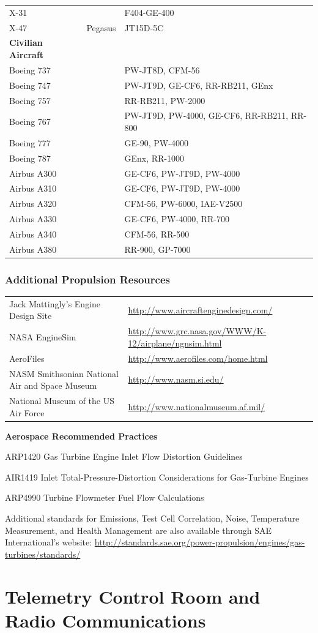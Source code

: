 \documentclass[
]{book}
\begin{document}
\begin{longtable}[]{@{}lll@{}}
X-31 & ~ & F404-GE-400\tabularnewline
X-47 & Pegasus & JT15D-5C\tabularnewline
\textbf{Civilian Aircraft} & &\tabularnewline
Boeing 737 & ~ & PW-JT8D, CFM-56\tabularnewline
Boeing 747 & ~ & PW-JT9D, GE-CF6, RR-RB211, GEnx\tabularnewline
Boeing 757 & ~ & RR-RB211, PW-2000\tabularnewline
Boeing 767 & ~ & PW-JT9D, PW-4000, GE-CF6, RR-RB211, RR-800\tabularnewline
Boeing 777 & ~ & GE-90, PW-4000\tabularnewline
Boeing 787 & ~ & GEnx, RR-1000\tabularnewline
Airbus A300 & ~ & GE-CF6, PW-JT9D, PW-4000\tabularnewline
Airbus A310 & ~ & GE-CF6, PW-JT9D, PW-4000\tabularnewline
Airbus A320 & ~ & CFM-56, PW-6000, IAE-V2500\tabularnewline
Airbus A330 & ~ & GE-CF6, PW-4000, RR-700\tabularnewline
Airbus A340 & ~ & CFM-56, RR-500\tabularnewline
Airbus A380 & ~ & RR-900, GP-7000\tabularnewline
\bottomrule
\end{longtable}

\hypertarget{additional-propulsion-resources}{%
\subsection{Additional Propulsion Resources}\label{additional-propulsion-resources}}

\begin{longtable}[]{@{}ll@{}}
\toprule
\endhead
Jack Mattingly's Engine Design Site & \url{http://www.aircraftenginedesign.com/}\tabularnewline
NASA EngineSim & \url{http://www.grc.nasa.gov/WWW/K-12/airplane/ngnsim.html}\tabularnewline
AeroFiles & \url{http://www.aerofiles.com/home.html}\tabularnewline
NASM Smithsonian National Air and Space Museum & \url{http://www.nasm.si.edu/}\tabularnewline
National Museum of the US Air Force & \url{http://www.nationalmuseum.af.mil/}\tabularnewline
\bottomrule
\end{longtable}

\textbf{Aerospace Recommended Practices}

ARP1420 Gas Turbine Engine Inlet Flow Distortion Guidelines

AIR1419 Inlet Total-Pressure-Distortion Considerations for Gas-Turbine Engines

ARP4990 Turbine Flowmeter Fuel Flow Calculations

Additional standards for Emissions, Test Cell Correlation, Noise, Temperature
Measurement, and Health Management are also available through SAE
International's website:
\url{http://standards.sae.org/power-propulsion/engines/gas-turbines/standards/}

\hypertarget{telemetry-control-room-and-radio-communications}{%
\chapter{Telemetry Control Room and Radio Communications}\label{telemetry-control-room-and-radio-communications}}
\end{document}
